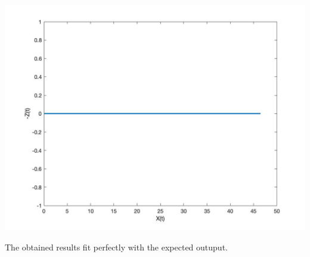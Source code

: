 \begin{center}
	\includegraphics[width=\linewidth]{../matlab/t3.jpg}
	\vspace{0.25cm}
	\vspace{0.25cm}
\end{center}

The obtained results fit perfectly with the expected outuput.